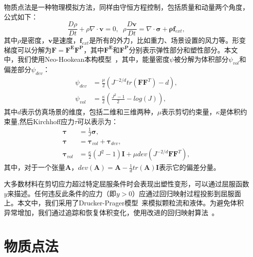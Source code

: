 物质点法是一种物理模拟方法，同样由守恒方程控制，包括质量和动量两个角度，公式如下：
\begin{equation}
\frac{D\rho}{Dt}+\rho \nabla \cdot \mathbf{v} = 0, \;\;
\rho \frac{D \mathbf{v}}{Dt} = \nabla \cdot\mathbf{\sigma} + \mathbf{\rho} \mathbf{f}_{ext},
\end{equation}
其中$\rho$是密度，$\mathbf{v}$是速度，$\mathbf{f}_{ext}$是所有的外力，比如重力、场景设置的风力等。形变梯度可以分解为$\mathbf{F}=\mathbf{F^E}\mathbf{F^P}$，其中$\mathbf{F^E}$和$\mathbf{F^P}$分别表示弹性部分和塑性部分。本文中，我们使用Neo-Hookean本构模型~\cite{DBLP:journals/tog/TuLZLWWQ24}，其中，能量密度$\psi$被分解为体积部分$\psi_{vol}$和偏差部分$\psi_{dev}$：
\begin{equation}
    \begin{aligned}
        \psi_{dev} &= \frac{\mu}{2}(J^{-2/d} tr(\mathbf{F}\mathbf{F}^T) - d), \\
        \psi_{vol} &= \frac{\kappa}{2}(
        \frac{J^2-1}{2}-log(J)
        ),
    \end{aligned}
\end{equation}
其中$d$表示仿真场景的维度，包括二维和三维两种，$\mu$表示剪切约束量，$\kappa$是体积约束量,然后Kirchhoff应力$\tau$可以表示为：
\begin{equation}
\begin{aligned}
    \mathbf{\tau} &= \frac{1}{J}\mathbf{\sigma},\\
    \mathbf{\tau} &= \mathbf{\tau}_{vol}+\mathbf{\tau}_{dev},\\
    \mathbf{\tau}_{vol} &= \frac{\kappa}{2}(J^2-1)\mathbf{I}+\mu dev(J^{-2/d} \mathbf{F}\mathbf{F}^T),
\end{aligned}
\end{equation}
其中，对于一个张量$\mathbf{A}$，$dev(\mathbf{A})=\mathbf{A}-\frac{1}{d}tr(\mathbf{A})\mathbf{I}$表示它的偏差分量。

大多数材料在剪切应力超过特定屈服条件时会表现出塑性变形，可以通过屈服函数$y$来描述。任何违反此条件的应力（即$y > 0$）应通过回归映射过程投影到屈服面上。本文中，我们采用了Drucker-Prager模型~\cite{klar2016drucker}来模拟颗粒流和液体。为避免体积异常增加，我们通过追踪和恢复体积变化，使用改进的回归映射算法~\cite{10.1145/3072959.3073651}。


\section{物质点法}

